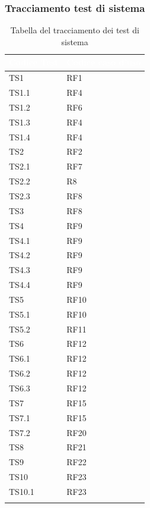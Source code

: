 \subsubsection{Tracciamento test di sistema}

{
    \setlength{\freewidth}{\dimexpr\textwidth-10\tabcolsep}
    \renewcommand{\arraystretch}{1.5}
    \centering
    \setlength{\aboverulesep}{0pt}
    \setlength{\belowrulesep}{0pt}
    \begin{longtable}{C{.25\freewidth} C{.25\freewidth}}
       \toprule
    \textcolor{white}{\textbf{Codice Test}}&
    \textcolor{white}{\textbf{Codice caso d'uso}}\\
    \toprule
    \endhead

    TS1 & RF1  \\  TS1.1 & RF4  \\   TS1.2 & RF6  \\  TS1.3 & RF4  \\
    TS1.4 & RF4  \\  TS2 & RF2  \\   TS2.1 & RF7  \\  TS2.2 & R8  \\
    TS2.3 & RF8  \\  TS3 & RF8  \\   TS4 & RF9  \\  TS4.1 & RF9  \\
    TS4.2 & RF9  \\  TS4.3 & RF9  \\   TS4.4 & RF9  \\  TS5 & RF10  \\
    TS5.1 & RF10  \\  TS5.2 & RF11  \\   TS6 & RF12  \\  TS6.1 & RF12  \\
    TS6.2 & RF12  \\  TS6.3 & RF12  \\   TS7 & RF15  \\  TS7.1 & RF15  \\
    TS7.2 & RF20  \\  TS8 & RF21  \\      TS9 & RF22  \\    TS10 & RF23  \\
    TS10.1 & RF23  \\
    
    \bottomrule
    \caption{Tabella del tracciamento dei test di sistema}
\end{longtable}
}

